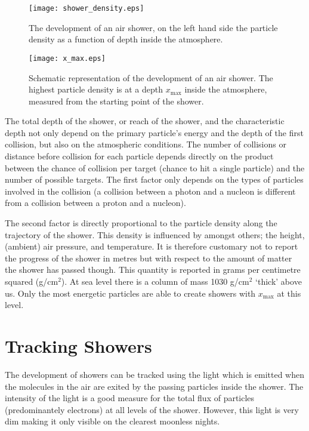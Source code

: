 \begin{figure}\begin{center}
\texttt{[image: shower\_density.eps]}%
\caption{The development of an air shower, on the left hand side the particle density as a function of depth inside the atmosphere.}\label{fig:shower_density}
\end{center}\end{figure}

\begin{figure}\begin{center}
\texttt{[image: x\_max.eps]}%
\caption{Schematic representation of the development of an air shower. The highest particle density is at a depth $x_{\mbox{max}}$ inside the atmosphere, measured from the starting point of the shower.}\label{fig:x_max}
\end{center}\end{figure}

The total depth of the shower, or reach of the shower, and the characteristic depth not only depend on the primary particle's energy and the depth of the first collision, but also on the atmospheric conditions. The number of collisions or distance before collision for each particle depends directly on the product between the chance of collision per target (chance to hit a single particle) and the number of possible targets. The first factor only depends on the types of particles involved in the collision (a collision between a photon and a nucleon is different from a collision between a proton and a nucleon).

The second factor is directly proportional to the particle density along the trajectory of the shower. This density is influenced by amongst others; the height, (ambient) air pressure, and temperature. It is therefore customary not to report the progress of the shower in metres but with respect to the amount of matter the shower has passed though. This quantity is reported in grams per centimetre squared (g/cm$^2$). At sea level there is a column of mass 1030 g/cm$^2$ `thick' above us. Only the most energetic particles are able to create showers with $x_{\mbox{max}}$ at this level.

\section{Tracking Showers}
The development of showers can be tracked using the light which is emitted when the molecules in the air are exited by the passing particles inside the shower. The intensity of the light is a good measure for the total flux of particles (predominantely electrons) at all levels of the shower. However, this light is very dim making it only visible on the clearest moonless nights.

